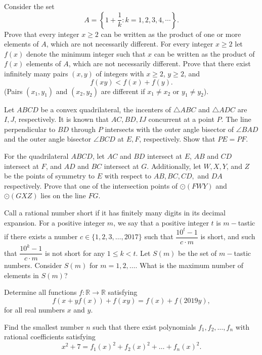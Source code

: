 \documentclass[11pt]{scrartcl}
\begin{document}
\begin{problem}[8823022869500312410]
Consider the set
\[A = \left\{1+\frac{1}{k} : k=1,2,3,4,\cdots \right\}.\]
Prove that every integer $x \geq 2$ can be written as the product of one or more elements of $A$, which are not necessarily different.
For every integer $x \geq 2$ let $f(x)$ denote the minimum integer such that $x$ can be written as the
product of $f(x)$ elements of $A$, which are not necessarily different.
Prove that there exist infinitely many pairs $(x,y)$ of integers with $x\geq 2$, $y \geq 2$, and\[f(xy)<f(x)+f(y).\](Pairs $(x_1,y_1)$ and $(x_2,y_2)$ are different if $x_1 \neq x_2$ or $y_1 \neq y_2$).
\end{problem}
\begin{problem}[4308913658510445082]
Let $ABCD$ be a convex quadrilateral, the incenters of $\triangle ABC$ and $\triangle ADC$ are $I,J$, respectively. It is known that $AC,BD,IJ$ concurrent at a point $P$. The line perpendicular to $BD$ through $P$ intersects with the outer angle bisector of $\angle BAD$ and the outer angle bisector $\angle BCD$ at $E,F$, respectively. Show that $PE=PF$.
\end{problem}
\begin{problem}[436681276656848]
For the quadrilateral $ABCD$, let $AC$ and $BD$ intersect at $E$, $AB$ and $CD$ intersect at $F$, and $AD$ and $BC$ intersect at $G$. Additionally, let $W, X, Y$, and $Z$ be the points of symmetry to $E$ with respect to $AB, BC, CD,$ and $DA$ respectively. Prove that one of the intersection points of $\odot(FWY)$ and $\odot(GXZ)$ lies on the line $FG$.
\end{problem}
\begin{problem}[6848161986234395515]
Call a rational number short if it has finitely many digits in its decimal expansion. For a positive integer $m$, we say that a positive integer $t$ is $m-$tastic if there exists a number $c\in \{1,2,3,\ldots ,2017\}$ such that $\dfrac{10^t-1}{c\cdot m}$ is short, and such that $\dfrac{10^k-1}{c\cdot m}$ is not short for any $1\le k<t$. Let $S(m)$ be the set of $m-$tastic numbers. Consider $S(m)$ for $m=1,2,\ldots{}.$ What is the maximum number of elements in $S(m)$?
\end{problem}
\begin{problem}[988671418474826]
	Determine all functions $f: \mathbb{R} \to \mathbb{R}$ satisfying
\[f(x + yf(x)) + f(xy) = f(x) + f(2019y),\]for all real numbers $x$ and $y$.
\end{problem}
\begin{problem}[3037670535896233971]
Find the smallest number $n$ such that there exist polynomials $f_1, f_2, \ldots , f_n$ with rational coefficients satisfying\[x^2+7 = f_1\left(x\right)^2 + f_2\left(x\right)^2 + \ldots + f_n\left(x\right)^2.\]
\end{problem}
\end{document}
